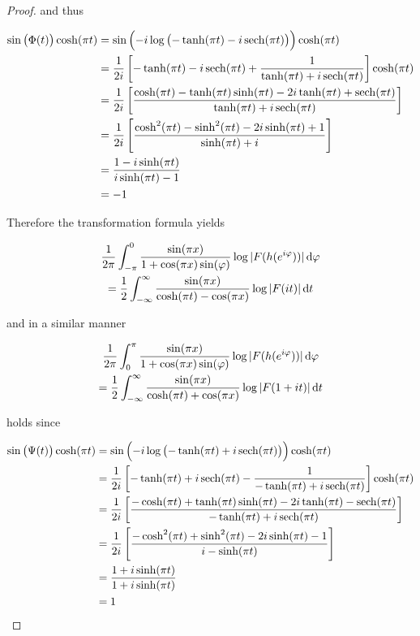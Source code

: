 \begin{proof}
and thus

\begin{gather*}
	\begin{aligned}
		\sin\left( \Phi(t) \right)\cosh(\pi t) &= \sin\left( -i\log\left( -\tanh (\pi t) - i \operatorname{sech}(\pi t) \right)\right) \cosh(\pi t)\\
		&= \frac{1}{2i} \left[ -\tanh(\pi t) - i\operatorname{sech}(\pi t) + \frac{1}{\tanh(\pi t) + i\operatorname{sech}(\pi t) }\right]\cosh(\pi t)\\
		&= \frac{1}{2i} \left[ \frac{\cosh(\pi t) - \tanh(\pi t) \sinh(\pi t) - 2i\tanh(\pi t) + \operatorname{sech}(\pi t)}{\tanh(\pi t) + i\operatorname{sech}(\pi t)}\right]\\
		&= \frac{1}{2i} \left[ \frac{\cosh^2(\pi t) - \sinh^2(\pi t) - 2i \sinh(\pi t) + 1}{\sinh(\pi t) + i}\right]\\
		&= \frac{1 - i\sinh(\pi t)}{i\sinh(\pi t) - 1}\\
		&= -1
	\end{aligned}
\end{gather*}

Therefore the transformation formula yields

\begin{multline}
	\frac{1}{2\pi} \int_{-\pi}^0 \frac{\sin(\pi x)}{1 + \cos(\pi x)\sin(\varphi)} \log \vert F(h(e^{i\varphi}))\vert \mathop{}\!\mathrm{d}\varphi\\ = \frac{1}{2}\int_{-\infty}^\infty\frac{\sin(\pi x)}{\cosh(\pi t) - \cos(\pi x)} \log\vert F(it) \vert \mathop{}\!\mathrm{d} t
\end{multline}
				
and in a similar manner
		
\begin{multline}
	\frac{1}{2\pi} \int_0^\pi \frac{\sin(\pi x)}{1 + \cos(\pi x)\sin(\varphi)} \log \vert F(h(e^{i\varphi}))\vert \mathop{}\!\mathrm{d}\varphi\\ = \frac{1}{2}\int_{-\infty}^\infty\frac{\sin(\pi x)}{\cosh(\pi t) + \cos(\pi x)} \log\vert F(1 + it) \vert \mathop{}\!\mathrm{d} t
\end{multline}

holds since

\begin{gather*}
	\begin{aligned}
		\sin\left(\Psi(t)\right)\cosh(\pi t) &= \sin\left( -i\log\left( -\tanh (\pi t) + i \operatorname{sech}(\pi t) \right)\right) \cosh(\pi t)\\
		&= \frac{1}{2i} \left[ -\tanh(\pi t) + i\operatorname{sech}(\pi t) - \frac{1}{-\tanh(\pi t) + i\operatorname{sech}(\pi t) }\right]\cosh(\pi t)\\
		&= \frac{1}{2i} \left[ \frac{-\cosh(\pi t) + \tanh(\pi t) \sinh(\pi t) - 2i\tanh(\pi t) - \operatorname{sech}(\pi t)}{-\tanh(\pi t) + i\operatorname{sech}(\pi t)}\right]\\
		&= \frac{1}{2i} \left[ \frac{- \cosh^2(\pi t) + \sinh^2(\pi t) - 2i \sinh(\pi t) - 1}{i - \sinh(\pi t)}\right]\\
		&= \frac{1 + i\sinh(\pi t)}{1 + i\sinh(\pi t)}\\
		&= 1
	\end{aligned}
\end{gather*}


\end{proof}
